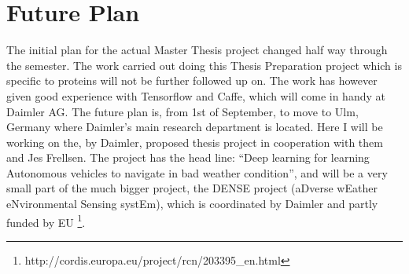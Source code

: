 \documentclass{article}
\begin{document}
\section{Future Plan}
The initial plan for the actual Master Thesis project changed half way through the semester. The work carried out doing this Thesis Preparation project which is specific to proteins will not be further followed up on. The work has however given good experience with Tensorflow and Caffe, which will come in handy at Daimler AG. The future plan is, from 1st of September, to move to Ulm, Germany where Daimler's main research department is located. Here I will be working on the, by Daimler, proposed thesis project in cooperation with them and Jes Frellsen. The project has the head line: ``Deep learning for learning Autonomous vehicles to navigate in bad weather condition'', and will be a very small part of the much bigger project, the DENSE project (aDverse wEather eNvironmental Sensing systEm), which is coordinated by Daimler and partly funded by EU  \footnote{http://cordis.europa.eu/project/rcn/203395\_en.html}.        





%


%
%
\end{document}
